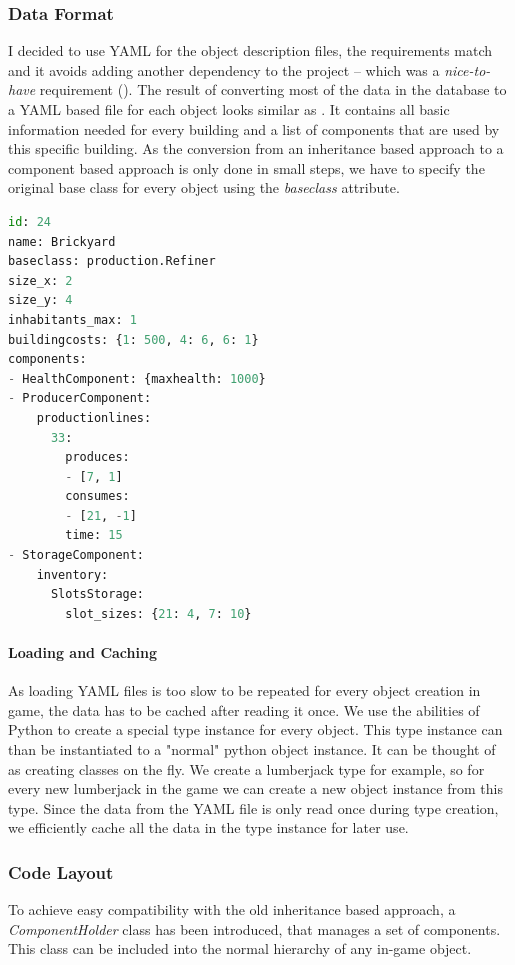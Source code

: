 \subsubsection{Data Format}
I decided to use YAML for the object description files, the requirements match and it avoids adding another
dependency to the project -- which was a \textit{nice-to-have} requirement (). The result of converting most of the data in the database to a YAML based file for each
object looks similar as . It contains all basic information needed for every building and a list of components
that are used by this specific building. As the conversion from an inheritance based approach to a component based
approach is only done in small steps, we have to specify the original base class for every object using the
\textit{baseclass} attribute.

\begin{lstlisting}[language=python,caption=A basic (shortened) building definition in YAML for \UH{}, label=uhyaml]
id: 24
name: Brickyard
baseclass: production.Refiner
size_x: 2
size_y: 4
inhabitants_max: 1
buildingcosts: {1: 500, 4: 6, 6: 1}
components:
- HealthComponent: {maxhealth: 1000}
- ProducerComponent:
    productionlines:
      33:
        produces:
        - [7, 1]
        consumes:
        - [21, -1]
        time: 15
- StorageComponent:
    inventory:
      SlotsStorage:
        slot_sizes: {21: 4, 7: 10}
\end{lstlisting}

\paragraph{Loading and Caching}
As loading YAML files is too slow to be repeated for every object creation in game, the data has to be cached after
reading it once. We use the abilities of Python to create a special type instance for every object. This type instance can
than be instantiated to a "normal" python object instance. It can be thought of as creating classes on the fly. We
create a lumberjack type for example, so for every new lumberjack in the game we can create a new object instance from
this type.
Since the data from the YAML file is only read once during type creation, we efficiently cache all the data in the
type instance for later use.

\subsubsection{Code Layout}
To achieve easy compatibility with the old inheritance based approach, a \textit{ComponentHolder} class has been
introduced, that manages a set of components. This class can be included into the normal hierarchy of any in-game object.

